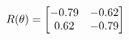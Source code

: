 \documentclass[preview]{standalone}
\begin{document}
\begin{align*}
\special{dvisvgm:raw <g id='unique000'>}R(\theta) = \begin{bmatrix}-0.79 & -0.62\\0.62 & -0.79\end{bmatrix}\special{dvisvgm:raw </g>}
\end{align*}
\end{document}
